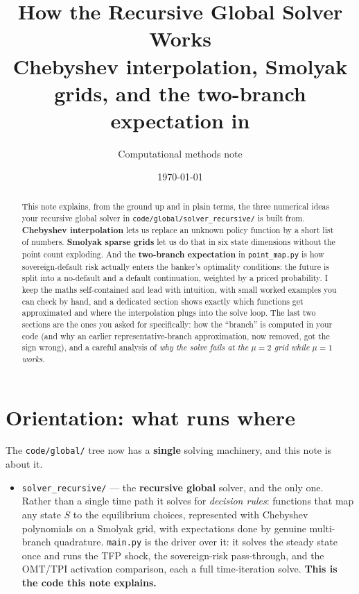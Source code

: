 \documentclass[11pt]{article}
\title{\vspace{-1.2cm}\bfseries How the Recursive Global Solver Works\\[4pt]
\large Chebyshev interpolation, Smolyak grids, and the two-branch expectation
in \code{code/global/solver\_recursive/}}
\author{Computational methods note}
\date{\today}
\newcommand{\code}[1]{\texttt{#1}}
\begin{document}
\maketitle

\begin{abstract}
\noindent This note explains, from the ground up and in plain terms, the
three numerical ideas your recursive global solver in
\code{code/global/solver\_recursive/} is built from. \textbf{Chebyshev
interpolation} lets us replace an unknown policy function by a short list of
numbers. \textbf{Smolyak sparse grids} let us do that in six state
dimensions without the point count exploding. And the \textbf{two-branch
expectation} in \code{point\_map.py} is how sovereign-default risk actually
enters the banker's optimality conditions: the future is split into a
no-default and a default continuation, weighted by a priced probability. I
keep the maths self-contained and lead with intuition, with small worked
examples you can check by hand, and a dedicated section shows exactly which
functions get approximated and where the interpolation plugs into the solve
loop. The last two sections are the ones you asked
for specifically: how the ``branch'' is computed in your code (and why an
earlier representative-branch approximation, now removed, got the sign
wrong), and a careful analysis of \emph{why the solve fails at the
$\mu{=}2$ grid while $\mu{=}1$ works.}
\end{abstract}

\tableofcontents

\vspace{0.4cm}
\section{Orientation: what runs where}
\label{sec:orient}

The \code{code/global/} tree now has a \textbf{single} solving machinery, and
this note is about it.

\begin{itemize}
\item \code{solver\_recursive/} --- the \textbf{recursive global} solver, and
      the only one. Rather than a single time path it solves for \emph{decision
      rules}: functions that map any state $S$ to the equilibrium choices,
      represented with Chebyshev polynomials on a Smolyak grid, with expectations
      done by genuine multi-branch quadrature. \code{main.py} is the driver over
      it: it solves the steady state once and runs the TFP shock, the sovereign-risk
      pass-through, and the OMT/TPI activation comparison, each a full time-iteration
      solve. \textbf{This is the code this note explains.}
\end{itemize}
\end{document}
